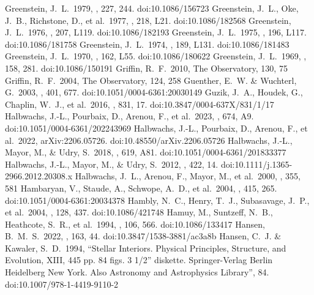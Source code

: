 \documentclass[twocolumn,tighten,twocolappendix]{aastex631}
\begin{document}
\begin{thebibliography}{}
 Greenstein, J.~L.\ 1979, \apj, 227, 244. doi:10.1086/156723
 Greenstein, J.~L., Oke, J.~B., Richstone, D., et al.\ 1977, \apjl, 218, L21. doi:10.1086/182568
 Greenstein, J.~L.\ 1976, \apjl, 207, L119. doi:10.1086/182193
 Greenstein, J.~L.\ 1975, \apjl, 196, L117. doi:10.1086/181758
 Greenstein, J.~L.\ 1974, \apjl, 189, L131. doi:10.1086/181483
 Greenstein, J.~L.\ 1970, \apjl, 162, L55. doi:10.1086/180622
 Greenstein, J.~L.\ 1969, \apj, 158, 281. doi:10.1086/150191
 Griffin, R.~F.\ 2010, The Observatory, 130, 75
 Griffin, R.~F.\ 2004, The Observatory, 124, 258
 Guenther, E.~W. \& Wuchterl, G.\ 2003, \aap, 401, 677. doi:10.1051/0004-6361:20030149
 Guzik, J.~A., Houdek, G., Chaplin, W.~J., et al.\ 2016, \apj, 831, 17. doi:10.3847/0004-637X/831/1/17
 Halbwachs, J.-L., Pourbaix, D., Arenou, F., et al.\ 2023, \aap, 674, A9. doi:10.1051/0004-6361/202243969
 Halbwachs, J.-L., Pourbaix, D., Arenou, F., et al.\ 2022, arXiv:2206.05726. doi:10.48550/arXiv.2206.05726
 Halbwachs, J.-L., Mayor, M., \& Udry, S.\ 2018, \aap, 619, A81. doi:10.1051/0004-6361/201833377
 Halbwachs, J.-L., Mayor, M., \& Udry, S.\ 2012, \mnras, 422, 14. doi:10.1111/j.1365-2966.2012.20308.x
 Halbwachs, J.~L., Arenou, F., Mayor, M., et al.\ 2000, \aap, 355, 581
 Hambaryan, V., Staude, A., Schwope, A.~D., et al.\ 2004, \aap, 415, 265. doi:10.1051/0004-6361:20034378
 Hambly, N.~C., Henry, T.~J., Subasavage, J.~P., et al.\ 2004, \aj, 128, 437. doi:10.1086/421748
 Hamuy, M., Suntzeff, N.~B., Heathcote, S.~R., et al.\ 1994, \pasp, 106, 566. doi:10.1086/133417
 Hansen, B.~M.~S.\ 2022, \aj, 163, 44. doi:10.3847/1538-3881/ac3a8b
 Hansen, C.~J. \& Kawaler, S.~D.\ 1994, ``Stellar Interiors.  Physical Principles, Structure, and Evolution, XIII, 445 pp. 84 figs. 3 1/2'' diskette.  Springer-Verlag Berlin Heidelberg New York.  Also Astronomy and Astrophysics Library'', 84. doi:10.1007/978-1-4419-9110-2

\end{thebibliography}
\end{document}

